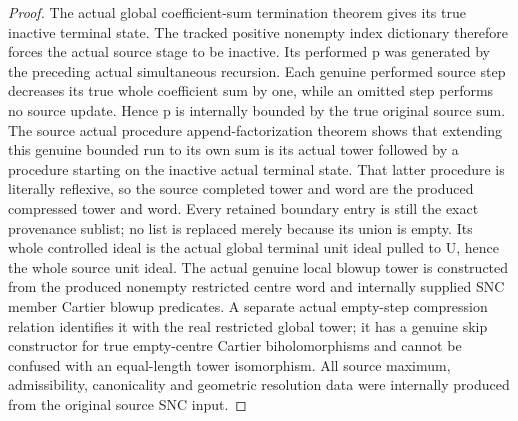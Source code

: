 \begin{proof}
The actual global coefficient-sum termination theorem gives its true inactive
terminal state. The tracked positive nonempty index dictionary therefore
forces the actual source stage to be inactive. Its performed p was generated
by the preceding actual simultaneous recursion. Each genuine performed source
step decreases its true whole coefficient sum by one, while an omitted step
performs no source update. Hence p is internally bounded by the true original
source sum. The source actual procedure append-factorization theorem shows
that extending this genuine bounded run to its own sum is its actual tower
followed by a procedure starting on the inactive actual terminal state. That
latter procedure is literally reflexive, so the source completed tower and
word are the produced compressed tower and word. Every retained boundary
entry is still the exact provenance sublist; no list is replaced merely because
its union is empty. Its whole controlled ideal is the actual global terminal
unit ideal pulled to U, hence the whole source unit ideal. The actual genuine
local blowup tower is constructed from the produced nonempty restricted centre
word and internally supplied SNC member Cartier blowup predicates. A separate
actual empty-step compression relation identifies it with the real restricted
global tower; it has a genuine skip constructor for true empty-centre Cartier
biholomorphisms and cannot be confused with an equal-length tower isomorphism.
All source maximum, admissibility, canonicality and geometric resolution data
were internally produced from the original source SNC input.
\end{proof}

